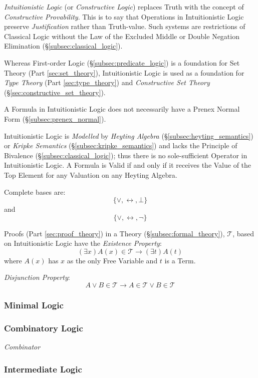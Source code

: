 \documentclass{article}
\begin{document}
\emph{Intuitionistic Logic} (or \emph{Constructive Logic}) replaces
Truth with the concept of \emph{Constructive Provability}. This is to
say that Operations in Intuitionistic Logic preserve
\emph{Justification} rather than Truth-value. Such systems are
restrictions of Classical Logic without the Law of the Excluded Middle
or Double Negation Elimination (\S\ref{subsec:classical_logic}).

Whereas First-order Logic (\S\ref{subsec:predicate_logic}) is a
foundation for Set Theory (Part \ref{sec:set_theory}), Intuitionistic
Logic is used as a foundation for \emph{Type Theory} (Part
\ref{sec:type_theory}) and \emph{Constructive Set Theory}
(\S\ref{sec:constructive_set_theory}).

A Formula in Intuitionistic Logic does not necessarily have a Prenex
Normal Form (\S\ref{subsec:prenex_normal}).

Intuitionistic Logic is \emph{Modelled} by \emph{Heyting Algebra}
(\S\ref{subsec:heyting_semantics}) or \emph{Kripke Semantics}
(\S\ref{subsec:kripke_semantics}) and lacks the Principle of Bivalence
(\S\ref{subsec:classical_logic}); thus there is no sole-sufficient
Operator in Intuitionistic Logic. A Formula is Valid if and only if it
receives the Value of the Top Element for any Valuation on any Heyting
Algebra.

Complete bases are:
\[
    \{ \vee, \leftrightarrow, \bot \}
\]
and
\[
    \{ \vee, \leftrightarrow, \neg \}
\]

Proofs (Part \ref{sec:proof_theory}) in a Theory
(\S\ref{subsec:formal_theory}), $\mathcal{T}$, based on Intuitionistic
Logic have the \emph{Existence Property}:
\[
    (\exists x)A(x) \in \mathcal{T} \rightarrow (\exists t)A(t)
\]
where $A(x)$ has $x$ as the only Free Variable and $t$ is a Term.

\emph{Disjunction Property}:
\[
    A \vee B \in \mathcal{T} \rightarrow A \in \mathcal{T} \vee B \in \mathcal{T}
\]

\subsubsection{Minimal Logic}

\subsubsection{Combinatory Logic}\label{subsec:combinatory_logic}

\emph{Combinator}

\subsubsection{Intermediate Logic}
\end{document}
